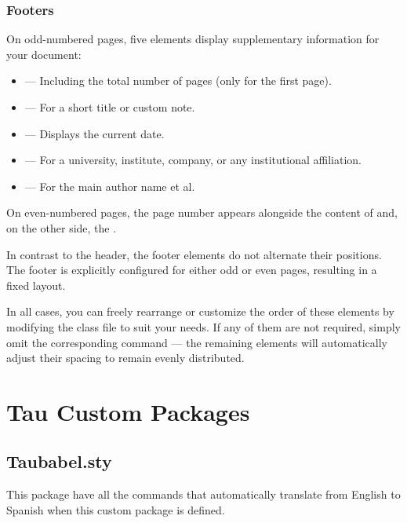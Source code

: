 \documentclass[9pt,a4paper,twocolumn,twoside]{tau-class/tau}
\begin{document}
        \subsubsection{Footers}

            On odd-numbered pages, five elements display supplementary information for your document:
    
            \begin{itemize}
                \item \inlinecode{\thepage} — Including the total number of pages (only for the first page).
                \item \inlinecode{\footinfo{}} — For a short title or custom note.
                \item \inlinecode{\theday{}} — Displays the current date.
                \item \inlinecode{\organization{}} — For a university, institute, company, or any institutional affiliation.
                \item \inlinecode{\leadauthor{}} — For the main author name et al.
            \end{itemize}

            On even-numbered pages, the page number appears alongside the content of \inlinecode{\footinfo{}} and, on the other side, the \inlinecode{\leadauthor{}}. 

            In contrast to the header, the footer elements do not alternate their positions. The footer is explicitly configured for either odd or even pages, resulting in a fixed layout.
            
            In all cases, you can freely rearrange or customize the order of these elements by modifying the class file to suit your needs. If any of them are not required, simply omit the corresponding command — the remaining elements will automatically adjust their spacing to remain evenly distributed.

\section{Tau Custom Packages}

    \subsection{Taubabel.sty}
		
		This package have all the commands that automatically translate from English to Spanish when this custom package is defined. 
		
\end{document}
